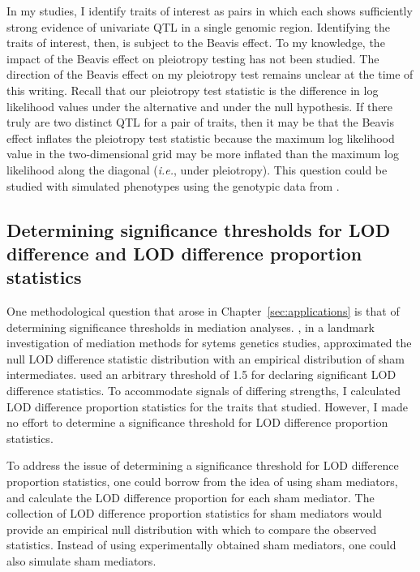 In my studies, I identify traits of interest as pairs in which each shows sufficiently strong evidence of univariate QTL in a single genomic region. Identifying the traits of interest, then, is subject to the Beavis effect. To my knowledge, the impact of the Beavis effect on pleiotropy testing has not been studied. The direction of the Beavis effect on my pleiotropy test remains unclear at the time of this writing. Recall that our pleiotropy test statistic is the difference in log likelihood values under the alternative and under the null hypothesis. If there truly are two distinct QTL for a pair of traits, then it may be that the Beavis effect inflates the pleiotropy test statistic because the maximum log likelihood value in the two-dimensional grid may be more inflated than the maximum log likelihood along the diagonal (\emph{i.e.}, under pleiotropy). This question could be studied with simulated phenotypes using the genotypic data from \citet{keller2018genetic}.






\subsection{Determining significance thresholds for LOD difference and LOD difference proportion statistics}

One methodological question that arose in Chapter~\ref{sec:applications} is that of determining significance thresholds in mediation analyses. \citet{chick2016defining}, in a landmark investigation of mediation methods for sytems genetics studies, approximated the null LOD difference statistic distribution with an empirical distribution of sham intermediates. \citet{keller2018genetic} used an arbitrary threshold of 1.5 for declaring significant LOD difference statistics. To accommodate signals of differing strengths, I calculated LOD difference proportion statistics for the traits that \citet{keller2018genetic} studied. However, I made no effort to determine a significance threshold for LOD difference proportion statistics. 

To address the issue of determining a significance threshold for LOD difference proportion statistics, one could borrow from \citet{chick2016defining} the idea of using sham mediators, and calculate the LOD difference proportion for each sham mediator. The collection of LOD difference proportion statistics for sham mediators would provide an empirical null distribution with which to compare the observed statistics. Instead of using experimentally obtained sham mediators, one could also simulate sham mediators.





